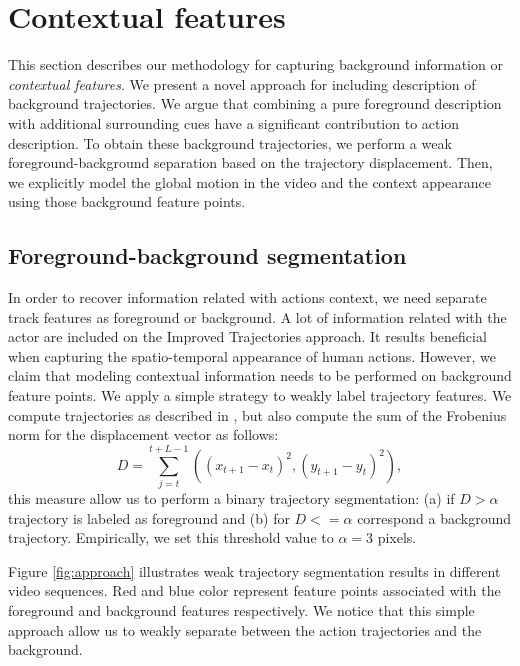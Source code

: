\section{Contextual features}
\label{scene}
This section describes our methodology for capturing background information or \textit{contextual features}. We present a novel approach for including description of background trajectories. We argue that combining a pure foreground description \cite{wang2013} with additional surrounding cues have a significant contribution to action description. To obtain these background trajectories, we perform a weak foreground-background separation based on the trajectory displacement. Then, we explicitly model the global motion in the video and the context appearance using those background feature points. 


\subsection{Foreground-background segmentation}
In order to recover information related with actions context, we need separate track features as foreground or background. A lot of information related with the actor are included on the Improved Trajectories approach. It results beneficial when capturing the spatio-temporal appearance of human actions. However, we claim that modeling contextual information needs to be performed on background feature points. We apply a simple strategy to weakly label trajectory features. We compute trajectories as described in \cite{wang2013}, but also compute the sum of the Frobenius norm for the displacement vector as follows:
\begin{equation}
D = \sum _{j=t}^{t+L-1}\left ( (x_{t+1}-x_t)^2, (y_{t+1}-y_t)^2 \right ),
\end{equation}
this measure allow us to perform a binary trajectory segmentation: (a) if $D>\alpha$ trajectory is labeled as foreground and (b) for $D<=\alpha$ correspond a background trajectory. Empirically, we set this threshold value to $\alpha=3$ pixels.


Figure \ref{fig:approach} illustrates weak trajectory segmentation results in different video sequences. Red and blue color represent feature points associated with the foreground and background features respectively. We notice that this simple approach allow us to weakly separate between the action trajectories and the background. 

